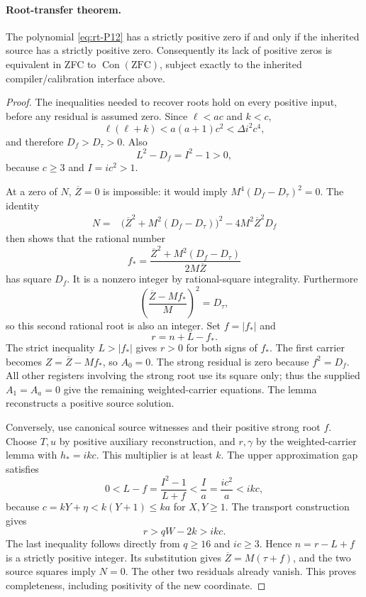 \paragraph{Root-transfer theorem.}
The polynomial \eqref{eq:rt-P12} has a strictly positive zero if and only
if the inherited source has a strictly positive zero.  Consequently its
lack of positive zeros is equivalent in ZFC to $\operatorname{Con}(\mathrm{ZFC})$,
subject exactly to the inherited compiler/calibration interface above.

\begin{proof}
The inequalities needed to recover roots hold on every positive input,
before any residual is assumed zero.  Since $\ell<ac$ and $k<c$,
\[
 \ell(\ell+k)<a(a+1)c^2<\Delta i^2c^4,
\]
and therefore $D_f>D_\tau>0$.  Also
\[
 L^2-D_f=I^2-1>0,
\]
because $c\ge3$ and $I=ic^2>1$.

At a zero of $N$, $\overline Z=0$ is impossible: it would imply
$M^4(D_f-D_\tau)^2=0$.  The identity
\begin{align*}
 N={}&\bigl(\overline Z^2+M^2(D_f-D_\tau)\bigr)^2
                     -4M^2\overline Z^2D_f
\end{align*}
then shows that the rational number
\[
 f_*=\frac{\overline Z^2+M^2(D_f-D_\tau)}{2M\overline Z}
\]
has square $D_f$.  It is a nonzero integer by rational-square
integrality.  Furthermore
\[
 \left(\frac{\overline Z-Mf_*}{M}\right)^2=D_\tau,
\]
so this second rational root is also an integer.
Set $f=|f_*|$ and
\[
 r=n+L-f_*.
\]
The strict inequality $L>|f_*|$ gives $r>0$ for both signs of $f_*$.
The first carrier becomes $Z=\overline Z-Mf_*$, so $A_0=0$.
The strong residual is zero because $f^2=D_f$.
All other registers involving the strong root use its square only;
thus the supplied $A_1=A_a=0$ give the remaining weighted-carrier
equations.  The lemma reconstructs a positive source solution.

Conversely, use canonical source witnesses and their positive strong root
$f$.  Choose $T,u$ by positive auxiliary reconstruction, and $r,\gamma$
by the weighted-carrier lemma with $h_*=ikc$.  This multiplier is at least
$k$.  The upper approximation gap satisfies
\[
 0<L-f=\frac{I^2-1}{L+f}<\frac{I}{a}
       =\frac{ic^2}{a}<ikc,
\]
because $c=kY+\eta<k(Y+1)\le ka$ for $X,Y\ge1$.
The transport construction gives
\[
 r>qW-2k>ikc.
\]
The last inequality follows directly from
$q\ge16$ and $ic\ge3$.
Hence $n=r-L+f$ is a strictly positive integer.
Its substitution gives $\overline Z=M(\tau+f)$, and the two source
squares imply $N=0$.  The other two residuals already vanish.
This proves completeness, including positivity of the new coordinate.
\end{proof}


